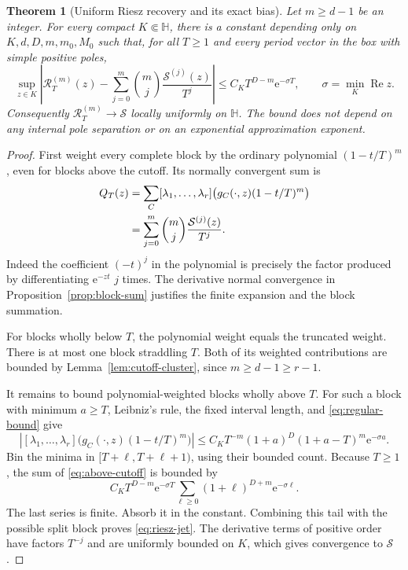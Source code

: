 \documentclass[11pt,a4paper]{article}
\numberwithin{equation}{section}
\newtheorem{theorem}{Theorem}[section]
\theoremstyle{definition}
\theoremstyle{remark}
\newcommand{\e}{\mathrm e}
\newcommand{\re}{\operatorname{Re}}
\newcommand{\Hh}{\mathbb H}
\newcommand{\Ssum}{\mathcal S}
\newcommand{\Riesz}{\mathcal R}
\begin{document}
\begin{theorem}[Uniform Riesz recovery and its exact bias]
\label{thm:riesz}
Let $m\ge d-1$ be an integer. For every compact $K\Subset\Hh$, there
is a constant depending only on $K,d,D,m,m_0,M_0$ such that, for all
$T\ge1$ and every period vector in the box with simple positive poles,
\begin{equation}
 \sup_{z\in K}\left|
 \Riesz_T^{(m)}(z)
  -\sum_{j=0}^m\binom{m}{j}\frac{\Ssum^{(j)}(z)}{T^j}
                 \right|
 \le C_KT^{D-m}\e^{-\sigma T},\qquad \sigma=\min_K\re z.
 \label{eq:riesz-jet}
\end{equation}
Consequently $\Riesz_T^{(m)}\to\Ssum$ locally uniformly on $\Hh$.
The bound does not depend on any internal pole separation or on an
exponential approximation exponent.
\end{theorem}
\begin{proof}
First weight every complete block by the ordinary polynomial
$(1-t/T)^m$, even for blocks above the cutoff. Its normally convergent
sum is
\begin{align}
 Q_T(z)
 &=\sum_C[\lambda_1,\ldots,\lambda_r]
             \bigl(g_C(\cdot,z)(1-t/T)^m\bigr)\notag\\
 &=\sum_{j=0}^m\binom{m}{j}\frac{\Ssum^{(j)}(z)}{T^j}.
 \label{eq:full-polynomial}
\end{align}
Indeed the coefficient $(-t)^j$ in the polynomial is precisely the
factor produced by differentiating $\e^{-zt}$ $j$ times. The derivative
normal convergence in Proposition~\ref{prop:block-sum} justifies the
finite expansion and the block summation.

For blocks wholly below $T$, the polynomial weight equals the truncated
weight. There is at most one block straddling $T$. Both of its weighted
contributions are bounded by Lemma~\ref{lem:cutoff-cluster}, since
$m\ge d-1\ge r-1$.

It remains to bound polynomial-weighted blocks wholly above $T$.
For such a block with minimum $a\ge T$, Leibniz's rule, the fixed
interval length, and \eqref{eq:regular-bound} give
\begin{equation}
 \left|[\lambda_1,\ldots,\lambda_r]
       \bigl(g_C(\cdot,z)(1-t/T)^m\bigr)\right|
 \le C_KT^{-m}(1+a)^D(1+a-T)^m\e^{-\sigma a}.
 \label{eq:above-cutoff}
\end{equation}
Bin the minima in $[T+\ell,T+\ell+1)$, using their bounded count.
Because $T\ge1$, the sum of \eqref{eq:above-cutoff} is bounded by
\[
 C_KT^{D-m}\e^{-\sigma T}
       \sum_{\ell\ge0}(1+\ell)^{D+m}\e^{-\sigma\ell}.
\]
The last series is finite. Absorb it in the constant. Combining this
tail with the possible split block proves \eqref{eq:riesz-jet}.
The derivative terms of positive order have factors $T^{-j}$ and are
uniformly bounded on $K$, which gives convergence to $\Ssum$.
\end{proof}
\end{document}
